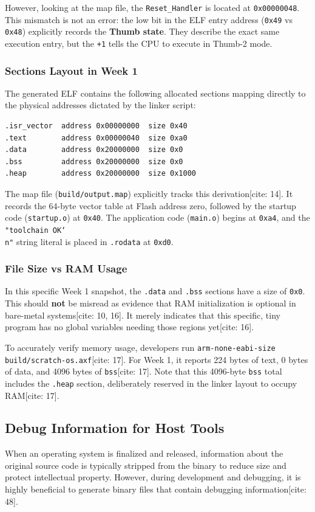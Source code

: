 However, looking at the map file, the \texttt{Reset\_Handler} is located at \texttt{0x00000048}. This mismatch is not an error: the low bit in the ELF entry address (\texttt{0x49} vs \texttt{0x48}) explicitly records the \textbf{Thumb state}. They describe the exact same execution entry, but the \texttt{+1} tells the CPU to execute in Thumb-2 mode.

\subsubsection{Sections Layout in Week 1}
The generated ELF contains the following allocated sections mapping directly to the physical addresses dictated by the linker script:

\begin{lstlisting}
.isr_vector  address 0x00000000  size 0x40
.text        address 0x00000040  size 0xa0
.data        address 0x20000000  size 0x0
.bss         address 0x20000000  size 0x0
.heap        address 0x20000000  size 0x1000
\end{lstlisting}

The map file (\texttt{build/output.map}) explicitly tracks this derivation[cite: 14]. It records the 64-byte vector table at Flash address zero, followed by the startup code (\texttt{startup.o}) at \texttt{0x40}. The application code (\texttt{main.o}) begins at \texttt{0xa4}, and the \texttt{"toolchain OK\char`\\n"} string literal is placed in \texttt{.rodata} at \texttt{0xd0}. 

\subsubsection{File Size vs RAM Usage}
In this specific Week 1 snapshot, the \texttt{.data} and \texttt{.bss} sections have a size of \texttt{0x0}. This should \textbf{not} be misread as evidence that RAM initialization is optional in bare-metal systems[cite: 10, 16]. It merely indicates that this specific, tiny program has no global variables needing those regions yet[cite: 16].

To accurately verify memory usage, developers run \texttt{arm-none-eabi-size build/scratch-os.axf}[cite: 17]. For Week 1, it reports 224 bytes of text, 0 bytes of data, and 4096 bytes of \texttt{bss}[cite: 17]. Note that this 4096-byte \texttt{bss} total includes the \texttt{.heap} section, deliberately reserved in the linker layout to occupy RAM[cite: 17].
\subsection{Debug Information for Host Tools}
When an operating system is finalized and released, information about the original source code is typically stripped from the binary to reduce size and protect intellectual property. However, during development and debugging, it is highly beneficial to generate binary files that contain debugging information[cite: 48]. 

